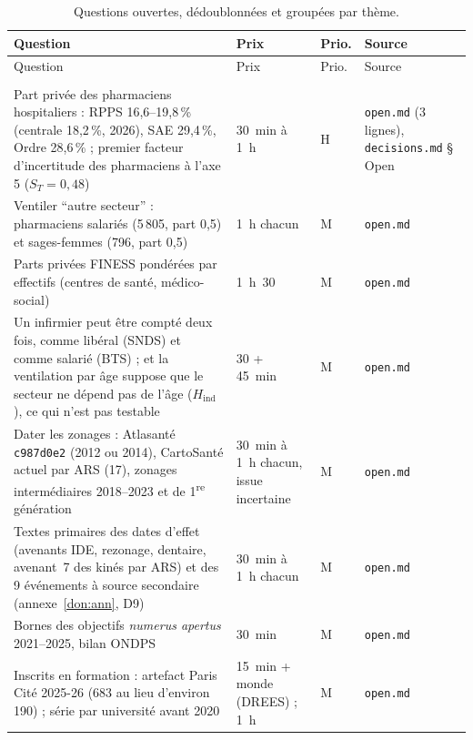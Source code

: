 \begin{small}
\setlength{\LTleft}{0pt}
\begin{longtable}{@{}p{}p{}p{}p{}@{}}
\caption{Questions ouvertes, dédoublonnées et groupées par thème.}\label{ouv:tab}\\
\toprule Question & Prix & Prio. & Source \\ \midrule\endfirsthead
\toprule Question & Prix & Prio. & Source \\ \midrule\endhead
\bottomrule\endfoot
\multicolumn{4}{@{}l}{\textbf{Données}}\\
Part privée des pharmaciens hospitaliers : RPPS 16,6--19,8\mesure{}\,\% (centrale 18,2\derive{}\,\%, 2026), SAE 29,4\mesure{}\,\%, Ordre 28,6\derive{}\,\% ; premier facteur d'incertitude des pharmaciens à l'axe 5 ($S_T=0{,}48$\mesure{}) & 30\suppose{}~min à 1\suppose{}~h & H & \texttt{open.md} (3 lignes), \texttt{decisions.md} § Open \\
Ventiler \enquote{autre secteur} : pharmaciens salariés (5\,805\mesure{}, part 0,5\suppose{}) et sages-femmes (796\mesure{}, part 0,5\suppose{}) & 1\suppose{}~h chacun & M & \texttt{open.md} \\
Parts privées FINESS pondérées par effectifs (centres de santé, médico-social) & 1\suppose{}~h~30 & M & \texttt{open.md} \\
Un infirmier peut être compté deux fois, comme libéral (SNDS) et comme salarié (BTS) ; et la ventilation par âge suppose que le secteur ne dépend pas de l'âge ($H_\mathrm{ind}$), ce qui n'est pas testable & 30\suppose{} + 45\suppose{}~min & M & \texttt{open.md} \\
Dater les zonages : Atlasanté \texttt{c987d0e2} (2012 ou 2014), CartoSanté actuel par ARS (17\mesure{}), zonages intermédiaires 2018--2023 et de 1\textsuperscript{re} génération & 30\suppose{}~min à 1\suppose{}~h chacun, issue incertaine & M & \texttt{open.md} \\
Textes primaires des dates d'effet (avenants IDE, rezonage, dentaire, avenant~7 des kinés par ARS) et des 9\mesure{} événements à source secondaire (annexe~\ref{don:ann}, D9) & 30\suppose{}~min à 1\suppose{}~h chacun & M & \texttt{open.md} \\
Bornes des objectifs \emph{numerus apertus} 2021--2025, bilan ONDPS & 30\suppose{}~min & M & \texttt{open.md} \\
Inscrits en formation : artefact Paris Cité 2025-26 (683\mesure{} au lieu d'environ 190\suppose{}) ; série par université avant 2020 & 15\suppose{}~min + monde (DREES) ; 1\suppose{}~h & M & \texttt{open.md} \\

\end{longtable}
\end{small}
